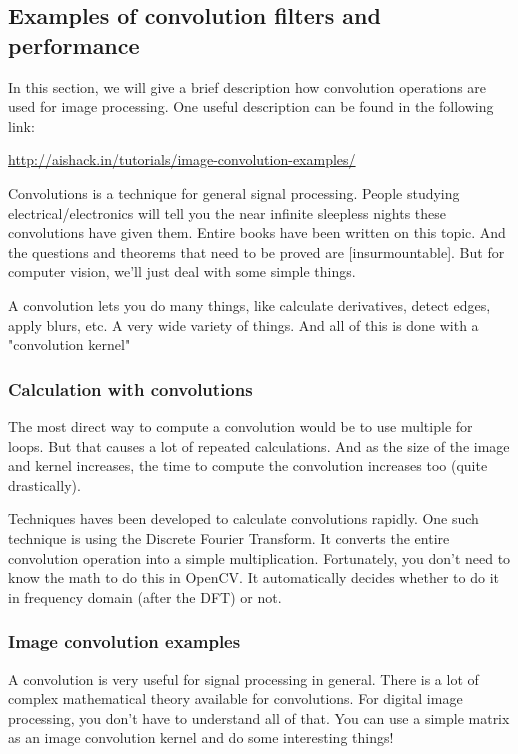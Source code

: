 \documentclass[10pt]{article}
\begin{document}
\subsection{Examples of convolution filters and performance}
In this section, we will give a brief description how convolution operations are used for image processing. One useful description can be found in the following link:

\href{http://aishack.in/tutorials/image-convolution-examples/}{http://aishack.in/tutorials/image-convolution-examples/}

Convolutions is a technique for general signal processing. People studying electrical/electronics will tell you the near infinite sleepless nights these convolutions have given them. Entire books have been written on this topic. And the questions and theorems that need to be proved are [insurmountable]. But for computer vision, we'll just deal with some simple things.

A convolution lets you do many things, like calculate derivatives, detect edges, apply blurs, etc. A very wide variety of things. And all of this is done with a "convolution kernel"

\subsubsection{Calculation with convolutions}
The most direct way to compute a convolution would be to use multiple for loops. But that causes a lot of repeated calculations. And as the size of the image and kernel increases, the time to compute the convolution increases too (quite drastically).

Techniques haves been developed to calculate convolutions rapidly. One such technique is using the Discrete Fourier Transform. It converts the entire convolution operation into a simple multiplication. Fortunately, you don't need to know the math to do this in OpenCV. It automatically decides whether to do it in frequency domain (after the DFT) or not.

\subsubsection{Image convolution examples}
A convolution is very useful for signal processing in general. There is a lot of complex mathematical theory available for convolutions. For digital image processing, you don't have to understand all of that. You can use a simple matrix as an image convolution kernel and do some interesting things!
\end{document}

